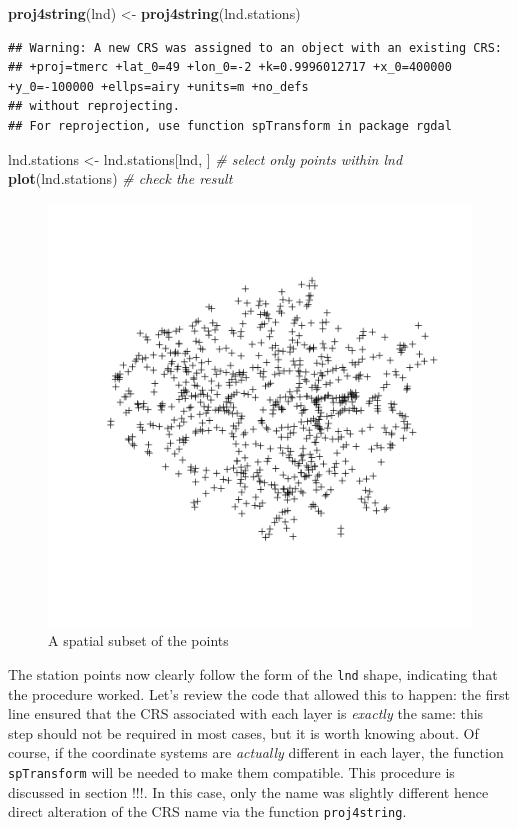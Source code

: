 \documentclass[]{article}
\makeatletter
\newenvironment{Shaded}{}{}
\newcommand{\KeywordTok}[1]{\textcolor[rgb]{0.00,0.44,0.13}{\textbf{{#1}}}}
\newcommand{\CommentTok}[1]{\textcolor[rgb]{0.38,0.63,0.69}{\textit{{#1}}}}
\newcommand{\NormalTok}[1]{{#1}}
\def\maxwidth{\ifdim\Gin@nat@width>\linewidth\linewidth
\else\Gin@nat@width\fi}
\let\Oldincludegraphics\includegraphics
\renewcommand{\includegraphics}[1]{\Oldincludegraphics[width=\maxwidth]{#1}}
\makeatother
\begin{document}
\begin{Shaded}
\begin{Highlighting}[]
\KeywordTok{proj4string}\NormalTok{(lnd) <- }\KeywordTok{proj4string}\NormalTok{(lnd.stations)}
\end{Highlighting}
\end{Shaded}
\begin{verbatim}
## Warning: A new CRS was assigned to an object with an existing CRS:
## +proj=tmerc +lat_0=49 +lon_0=-2 +k=0.9996012717 +x_0=400000 +y_0=-100000 +ellps=airy +units=m +no_defs
## without reprojecting.
## For reprojection, use function spTransform in package rgdal
\end{verbatim}
\begin{Shaded}
\begin{Highlighting}[]
\NormalTok{lnd.stations <- lnd.stations[lnd, ]  }\CommentTok{# select only points within lnd}
\KeywordTok{plot}\NormalTok{(lnd.stations)  }\CommentTok{# check the result}
\end{Highlighting}
\end{Shaded}
\begin{figure}[htbp]
\centering
\includegraphics{figure/A_spatial_subset_of_the_points.png}
\caption{A spatial subset of the points}
\end{figure}

The station points now clearly follow the form of the \texttt{lnd}
shape, indicating that the procedure worked. Let's review the code that
allowed this to happen: the first line ensured that the CRS associated
with each layer is \emph{exactly} the same: this step should not be
required in most cases, but it is worth knowing about. Of course, if the
coordinate systems are \emph{actually} different in each layer, the
function \texttt{spTransform} will be needed to make them compatible.
This procedure is discussed in section !!!. In this case, only the name
was slightly different hence direct alteration of the CRS name via the
function \texttt{proj4string}.
\end{document}
